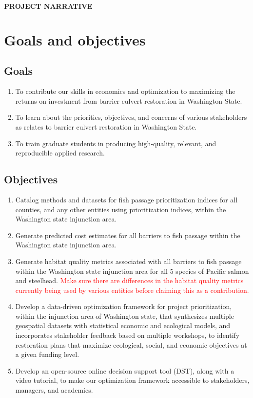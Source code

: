\documentclass[12pt]{elsarticle}
\begin{document}
\begin{center} \textbf{PROJECT NARRATIVE} \end{center}

%
\section{Goals and objectives} 
\subsection{Goals}
\begin{enumerate}
\item To contribute our skills in economics and optimization to maximizing the returns on investment from barrier culvert restoration in Washington State.
\item To learn about the priorities, objectives, and concerns of various stakeholders as relates to barrier culvert restoration in Washington State.
\item To train graduate students in producing high-quality, relevant, and reproducible applied research.
\end{enumerate}

\subsection{Objectives}
\begin{enumerate}
\item Catalog methods and datasets for fish passage prioritization indices for all counties, and any other entities using prioritization indices, within the Washington state injunction area. 
\item Generate predicted cost estimates for all barriers to fish passage within the Washington state injunction area. 
\item Generate habitat quality metrics associated with all barriers to fish passage within the Washington state injunction area for all 5 species of Pacific salmon and steelhead. \textcolor{red}{Make sure there are differences in the habitat quality metrics currently being used by various entities before claiming this as a contribution.}
\item Develop a data-driven optimization framework for project prioritization, within the injunction area of Washington state, that synthesizes multiple geospatial datasets with statistical economic and ecological models, and incorporates stakeholder feedback based on multiple workshops, to identify restoration plans that maximize ecological, social, and economic objectives at a given funding level.
\item Develop an open-source online decision support tool (DST), along with a video tutorial, to make our optimization framework accessible to stakeholders, managers, and academics.
\end{enumerate}
\end{document}
